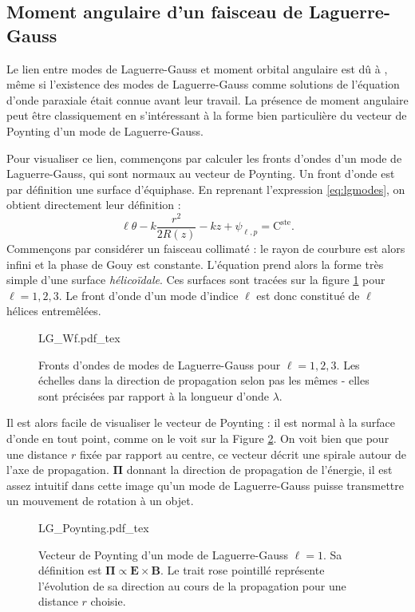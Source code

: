 \subsection{Moment angulaire d'un faisceau de Laguerre-Gauss}
Le lien entre modes de Laguerre-Gauss et moment orbital angulaire est dû à , même si l'existence des modes de Laguerre-Gauss comme solutions de l'équation d'onde paraxiale était connue avant leur travail. La présence de moment angulaire peut être classiquement en s'intéressant à la forme bien particulière du vecteur de Poynting d'un mode de Laguerre-Gauss.\par
Pour visualiser ce lien, commençons par calculer les fronts d'ondes d'un mode de Laguerre-Gauss, qui sont normaux au vecteur de Poynting.
Un front d'onde est par définition une surface d'équiphase. En reprenant l'expression \ref{eq:lgmodes}, on obtient directement leur définition :
\begin{equation*}
\ell\theta-k\frac{r^2}{2R(z)}-kz+\psi _{\ell ,p} = \mathrm{C}^\mathrm{ste}.
\end{equation*}
Commençons par considérer un faisceau collimaté : le rayon de courbure est alors infini et la phase de Gouy est constante. L'équation prend alors la forme très simple d'une surface \textit{hélicoïdale}. Ces surfaces sont tracées sur la figure \ref{Fig:LGwf} pour $\ell = 1,2,3$. Le front d'onde d'un mode d'indice $\ell$ est donc constitué de $\ell$ hélices entremêlées.
\begin{figure}[!ht]
\centering
\def\svgwidth{\columnwidth}
{LG_Wf.pdf_tex}
\caption{Fronts d'ondes de modes de Laguerre-Gauss pour $\ell=1,2,3$. Les échelles dans la direction de propagation selon pas les mêmes - elles sont précisées par rapport à la longueur d'onde $\lambda$.}
\label{Fig:LGwf}
\end{figure}

Il est alors facile de visualiser le vecteur de Poynting : il est normal à la surface d'onde en tout point, comme on le voit sur la Figure \ref{Fig:LGPoynting}. On voit bien que pour une distance $r$ fixée par rapport au centre, ce vecteur décrit une spirale autour de l'axe de propagation. $\bm{\Pi}$ donnant la direction de propagation de l'énergie, il est assez intuitif dans cette image qu'un mode de Laguerre-Gauss puisse transmettre un mouvement de rotation à un objet.

\begin{figure}[!ht]
\centering
\def\svgwidth{0.7\columnwidth}
{LG_Poynting.pdf_tex}
\caption{Vecteur de Poynting d'un mode de Laguerre-Gauss $\ell=1$. Sa définition est $\bm{\Pi} \propto \bm{E}\times\bm{B}$. Le trait rose pointillé représente l'évolution de sa direction au cours de la propagation pour une distance $r$ choisie.}
\label{Fig:LGPoynting}
\end{figure}

